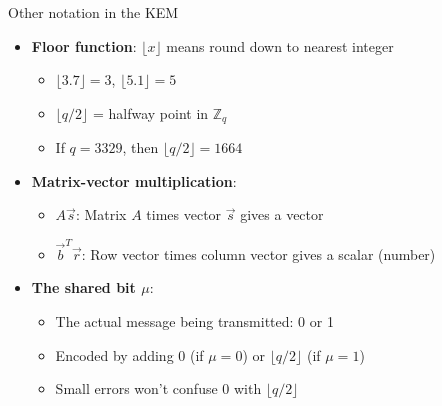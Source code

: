 \documentclass[aspectratio=169, lualatex, handout]{beamer}
\begin{document}
\begin{frame}{Other notation in the KEM}
	\begin{itemize}
		\item \textbf{Floor function}: $\lfloor x \rfloor$ means round down to nearest integer
		      \begin{itemize}
			      \item $\lfloor 3.7 \rfloor = 3$, $\lfloor 5.1 \rfloor = 5$
			      \item $\lfloor q/2 \rfloor$ = halfway point in $\mathbb{Z}_q$
			      \item If $q = 3329$, then $\lfloor q/2 \rfloor = 1664$
		      \end{itemize}
		\item \textbf{Matrix-vector multiplication}:
		      \begin{itemize}
			      \item $A\vec{s}$: Matrix $A$ times vector $\vec{s}$ gives a vector
			      \item $\vec{b}^T\vec{r}$: Row vector times column vector gives a scalar (number)
		      \end{itemize}
		\item \textbf{The shared bit $\mu$}:
		      \begin{itemize}
			      \item The actual message being transmitted: 0 or 1
			      \item Encoded by adding 0 (if $\mu = 0$) or $\lfloor q/2 \rfloor$ (if $\mu = 1$)
			      \item Small errors won't confuse 0 with $\lfloor q/2 \rfloor$
		      \end{itemize}
	\end{itemize}
\end{frame}
\end{document}
